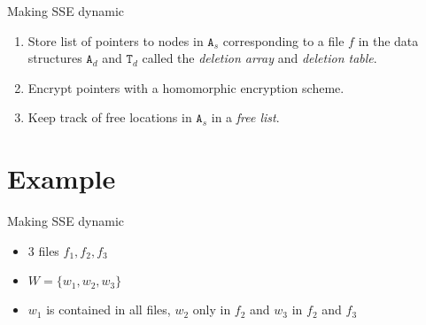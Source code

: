 \documentclass{beamer}
\begin{document}
\begin{frame}{Making SSE dynamic}
\begin{enumerate}
\item Store list of pointers to nodes in \(\mathtt{A}_s\)
	corresponding to a file \(f\) in the
	data structures \(\mathtt{A}_d\) and \(\mathtt{T}_d\)
	called the \emph{deletion array} and \emph{deletion table}.
\item Encrypt pointers with a homomorphic encryption scheme.
\item Keep track of free locations in \(\mathtt{A}_s\) in a \emph{free list}.
\end{enumerate}
\end{frame}


\section{Example}

\begin{frame}{Making SSE dynamic}
\begin{itemize}
\item 3 files \(f_1, f_2, f_3\)
\item \(W = \{w_1, w_2, w_3\}\)
\item \(w_1\) is contained in all files, \(w_2\) only in \(f_2\) and \(w_3\)
	in \(f_2\) and \(f_3\)
\end{itemize}
\end{frame}
\end{document}
